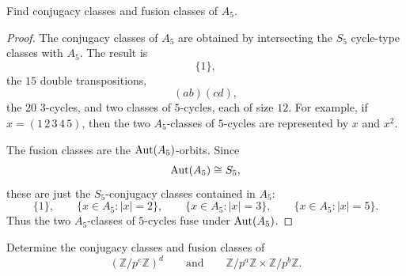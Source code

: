 
\providecommand{\rank}{\operatorname{rank}}
\providecommand{\Sym}{\operatorname{Sym}}
\providecommand{\Syl}{\operatorname{Syl}}
\providecommand{\Hall}{\operatorname{Hall}}
\providecommand{\Hol}{\operatorname{Hol}}
\providecommand{\Inn}{\operatorname{Inn}}
\providecommand{\Out}{\operatorname{Out}}
\providecommand{\Fit}{\operatorname{Fit}}
\providecommand{\Core}{\operatorname{Core}}

\begin{exercise}
Find conjugacy classes and fusion classes of \(A_5\).
\end{exercise}

\begin{proof}
The conjugacy classes of \(A_5\) are obtained by intersecting the \(S_5\)
cycle-type classes with \(A_5\). The result is
\[
    \{1\},
\]
the \(15\) double transpositions,
\[
    (ab)(cd),
\]
the \(20\) \(3\)-cycles, and two classes of \(5\)-cycles, each of size \(12\).
For example, if \(x=(1\,2\,3\,4\,5)\), then the two \(A_5\)-classes of
\(5\)-cycles are represented by \(x\) and \(x^2\).

The fusion classes are the \(\operatorname{Aut}(A_5)\)-orbits. Since
\[
    \operatorname{Aut}(A_5)\cong S_5,
\]
these are just the \(S_5\)-conjugacy classes contained in \(A_5\):
\[
    \{1\},\qquad
    \{x\in A_5: |x|=2\},\qquad
    \{x\in A_5: |x|=3\},\qquad
    \{x\in A_5: |x|=5\}.
\]
Thus the two \(A_5\)-classes of \(5\)-cycles fuse under \(\operatorname{Aut}(A_5)\).
\end{proof}

\begin{exercise}
    Determine the conjugacy classes and fusion classes of
    \[
        (\mathbb Z/p^e\mathbb Z)^d
        \qquad\text{and}\qquad
        \mathbb Z/p^a\mathbb Z\times \mathbb Z/p^b\mathbb Z.
    \]
    \end{exercise}
    
